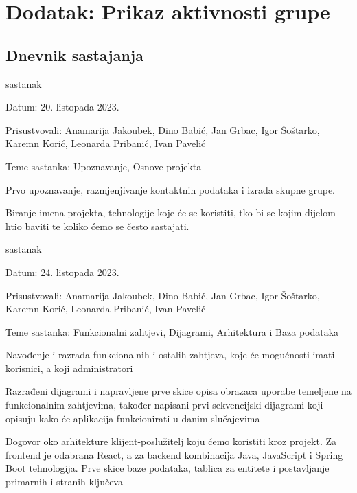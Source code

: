 \chapter*{Dodatak: Prikaz aktivnosti grupe}
		
		\section*{Dnevnik sastajanja}
		
		\begin{packed_enum}
			
			\item  sastanak
			\item[] \begin{packed_item}
				\item Datum: 20. listopada 2023.
				\item Prisustvovali: Anamarija Jakoubek, Dino Babić, Jan Grbac, Igor Šoštarko, Karemn Korić, Leonarda Pribanić, Ivan Pavelić
				\item Teme sastanka: Upoznavanje, Osnove projekta
				\begin{packed_item}
					\item Prvo upoznavanje, razmjenjivanje kontaktnih podataka i izrada skupne grupe.
					\item Biranje imena projekta, tehnologije koje će se koristiti, tko bi se kojim dijelom htio baviti te koliko ćemo se često sastajati.
				\end{packed_item}
			\end{packed_item}
			
			\item  sastanak
			\item[] \begin{packed_item}
				\item Datum: 24. listopada 2023.
				\item Prisustvovali: Anamarija Jakoubek, Dino Babić, Jan Grbac, Igor Šoštarko, Karemn Korić, Leonarda Pribanić, Ivan Pavelić
				\item Teme sastanka: Funkcionalni zahtjevi, Dijagrami, Arhitektura i Baza podataka
				\begin{packed_item}
					\item  Navođenje i razrada funkcionalnih i ostalih zahtjeva, koje će mogućnosti imati korisnici, a koji administratori
					\item  Razrađeni dijagrami i napravljene prve skice opisa obrazaca uporabe temeljene na funkcionalnim zahtjevima, također napisani prvi sekvencijski dijagrami koji opisuju kako će aplikacija funkcionirati u danim slučajevima
					\item Dogovor oko arhitekture klijent-poslužitelj koju ćemo koristiti kroz projekt. Za frontend je odabrana React, a za backend kombinacija Java, JavaScript i Spring Boot tehnologija. Prve skice baze podataka, tablica za entitete i postavljanje primarnih i stranih ključeva
				\end{packed_item}
			\end{packed_item}
			

\end{packed_enum}

